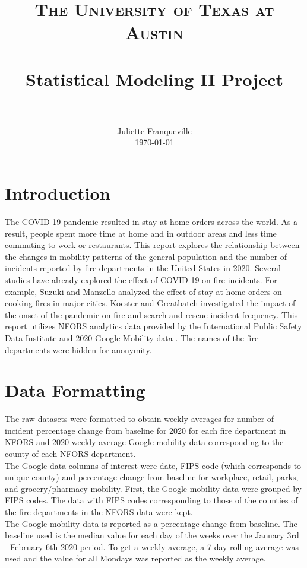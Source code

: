 \documentclass[paper=a4, fontsize=11pt]{scrartcl}
\title{
		\usefont{OT1}{bch}{b}{n}
		\normalfont \normalsize \textsc{The University of Texas at Austin} \\ [25pt]
		\horrule{0.5pt} \\[0.4cm]
		\huge Statistical Modeling II Project \\
		\horrule{2pt} \\[0.5cm]
}
\author{
		\normalfont 								\normalsize
        Juliette Franqueville\\[-3pt]		\normalsize
        \today
}
\date{}
\numberwithin{equation}{section}		%
\numberwithin{figure}{section}			%
\numberwithin{table}{section}				%
\begin{document}
\maketitle
\newpage
\section{Introduction}

The COVID-19 pandemic resulted in stay-at-home orders across the world. As a result, people spent more time at home and in outdoor areas and less time commuting to work or restaurants. This report explores the relationship between the changes in mobility patterns of the general population and the number of incidents reported by fire departments in the United States in 2020. Several studies have already explored the effect of COVID-19 on fire incidents. For example, Suzuki and Manzello \cite{fire_paper} analyzed the effect of stay-at-home orders on cooking fires in major cities. Koester and Greatbatch \cite{koester2020comparing} investigated the impact of the onset of the pandemic on fire and search and rescue incident frequency. This report utilizes NFORS \cite{nfors} analytics data provided by the International Public Safety Data Institute and 2020 Google Mobility data \cite{google}. The names of the fire departments were hidden for anonymity. 

\section{Data Formatting}
The raw datasets were formatted to obtain weekly averages for number of incident percentage change from baseline for 2020 for each fire department in NFORS and 2020 weekly average Google mobility data corresponding to the county of each NFORS department.\\


The Google data columns of interest were date,  FIPS code (which corresponds to unique county) and percentage change from baseline for workplace, retail, parks, and grocery/pharmacy mobility. First, the Google mobility data were grouped by FIPS codes.  The data with FIPS codes corresponding to those of the counties of the fire departments in the NFORS data were kept.\\



The Google mobility data is reported as a percentage change from baseline. The baseline used is the median value for each day of the weeks over the January 3rd - February 6th 2020 period. To get a weekly average, a 7-day rolling average was used and the value for all Mondays was reported as the weekly average. \\
\end{document}

